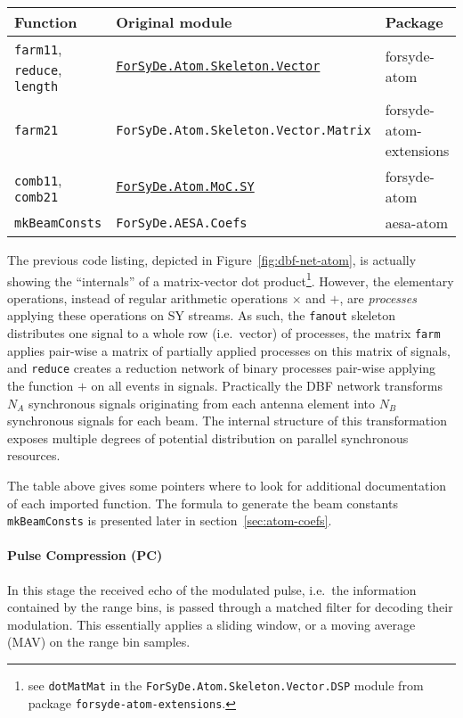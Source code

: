\documentclass[
  a4paper,
]{article}
\let\oldparagraph\paragraph
\renewcommand{\paragraph}[1]{\oldparagraph{#1}\mbox{}}
\begin{document}
\begin{longtable}[]{@{}lll@{}}
\toprule
Function & Original module & Package\tabularnewline
\midrule
\endhead
\texttt{farm11}, \texttt{reduce}, \texttt{length} &
\href{https://forsyde.github.io/forsyde-atom/api/ForSyDe-Atom-Skeleton-Vector.html}{\texttt{ForSyDe.Atom.Skeleton.Vector}}
& forsyde-atom\tabularnewline
\texttt{farm21} & \texttt{ForSyDe.Atom.Skeleton.Vector.Matrix} &
forsyde-atom-extensions\tabularnewline
\texttt{comb11}, \texttt{comb21} &
\href{https://forsyde.github.io/forsyde-atom/api/ForSyDe-Atom-MoC-SY.html}{\texttt{ForSyDe.Atom.MoC.SY}}
& forsyde-atom\tabularnewline
\texttt{mkBeamConsts} & \texttt{ForSyDe.AESA.Coefs} &
aesa-atom\tabularnewline
\bottomrule
\end{longtable}

The previous code listing, depicted in Figure~\ref{fig:dbf-net-atom}, is
actually showing the ``internals'' of a matrix-vector dot
product\footnote{see \texttt{dotMatMat} in the
  \texttt{ForSyDe.Atom.Skeleton.Vector.DSP} module from package
  \texttt{forsyde-atom-extensions}.}. However, the elementary
operations, instead of regular arithmetic operations \(\times\) and
\(+\), are \emph{processes} applying these operations on SY streams. As
such, the \texttt{fanout} skeleton distributes one signal to a whole row
(i.e.~vector) of processes, the matrix \texttt{farm} applies pair-wise a
matrix of partially applied processes on this matrix of signals, and
\texttt{reduce} creates a reduction network of binary processes
pair-wise applying the function \(+\) on all events in signals.
Practically the DBF network transforms \(N_A\) synchronous signals
originating from each antenna element into \(N_B\) synchronous signals
for each beam. The internal structure of this transformation exposes
multiple degrees of potential distribution on parallel synchronous
resources.

The table above gives some pointers where to look for additional
documentation of each imported function. The formula to generate the
beam constants \texttt{mkBeamConsts} is presented later in
section~\ref{sec:atom-coefs}.

\hypertarget{sec:pc-atom-net}{%
\paragraph{Pulse Compression (PC)}\label{sec:pc-atom-net}}

In this stage the received echo of the modulated pulse, i.e.~the
information contained by the range bins, is passed through a matched
filter for decoding their modulation. This essentially applies a sliding
window, or a moving average (MAV) on the range bin samples.
\end{document}
